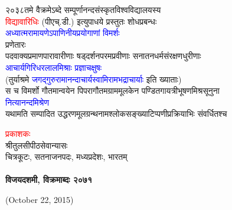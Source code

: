 \documentclass[twoside]{book}
\begin{document}
\begin{titlepage}
\begin{center}
{\fontsize{14}{21} \selectfont \textcolor{BrickRed}{२०३८तमे वैक्रमेऽब्दे सम्पूर्णानन्दसंस्कृतविश्वविद्यालयस्य\\[2pt] \textcolor{red}{विद्यावारिधिः} (पीएच्.डी.) इत्युपाधये प्रस्तुतः शोधप्रबन्धः}}\\[10pt]
{\fontsize{27}{40.5} \selectfont \textcolor{blue}{अध्यात्मरामायणेऽपाणिनीयप्रयोगाणां विमर्शः}}\\[30pt]
 \vfill
{\fontsize{14}{21} \selectfont प्रणेतारः}\\[5pt]
{\fontsize{16}{24} \selectfont \textcolor{BrickRed}{पदवाक्यप्रमाणपारावारीणाः षड्दर्शनपरमप्रवीणाः सनातनधर्मसंरक्षणधुरीणाः}}\\[5pt]
{\fontsize{21}{31.5} \selectfont \textcolor{blue}{आचार्यगिरिधरलालमिश्राः प्रज्ञाचक्षुषः}}\\[5pt]
{\fontsize{16}{24} \selectfont \textcolor{BrickRed}{(तुर्याश्रमे \textcolor{blue}{जगद्गुरुरामानन्दाचार्यस्वामिरामभद्राचार्याः} इति ख्याताः)}}\\[7pt]
\vfill
{\fontsize{14}{21} \selectfont \textcolor{BrickRed}{स च विमर्शो गौतमान्वयेन पिपरागौतमग्राममूलकेन पण्डितगायत्रीभूषणमिश्रसूनुना}}\\[5pt]
{\fontsize{18}{24} \selectfont \textcolor{blue}{नित्यानन्दमिश्रेण}}\\[5pt]
{\fontsize{14}{21} \selectfont \textcolor{BrickRed}{यथामति सम्पादित उद्धरणमूलग्रन्थनामश्लोकसङ्ख्याटिप्पणीप्रक्रियाभिः संवर्धितश्च}}
\end{center}
\pagebreak
{\fontsize{14}{21} \selectfont \textcolor{red}{प्रकाशकः}}\\[-4pt]

{\fontsize{14}{21} \selectfont श्रीतुलसीपीठसेवान्यासः}\\[-4pt]

{\fontsize{14}{21} \selectfont चित्रकूटः, सतनाजनपदः, मध्यप्रदेशः, भारतम्}\\[-4pt]
\vfill
\noindent {\fontsize{14}{21} \selectfont \textcolor{red}{तृतीयसङ्गणकीयसंस्करणम्}}\\[-4pt]

{\fontsize{14}{21} \selectfont \bfseries विजयदशमी, विक्रमाब्दः २०७१}\\[-4pt]

{\fontsize{14}{21} \selectfont \begin{english}(October 22, 2015)\end{english}}\\[-4pt]
\vfill
{}
\noindent {\fontsize{14}{21} \selectfont \textcolor{red}{\begin{english}©\end{english} सर्वाधिकारः}}\\[-4pt]


\end{titlepage}
\end{document}
